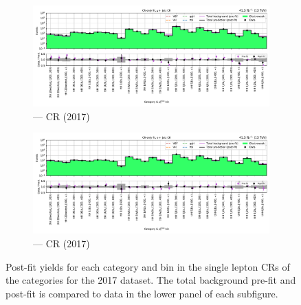 \begin{figure}[htbp]
    \centering
    \begin{subfigure}[b]{\textwidth}
        \includegraphics[width=\textwidth]{chapters/higgstoinv/figures/mountain_ranges/2017/ttH/Wmunu_tree_fit_b-abs_values_ttH_cats.pdf}
        \caption{\ttH --- \singleMuCr \gls{CR} (2017)}
    \end{subfigure}

    \begin{subfigure}[b]{\textwidth}
        \includegraphics[width=\textwidth]{chapters/higgstoinv/figures/mountain_ranges/2017/ttH/Wenu_tree_fit_b-abs_values_ttH_cats.pdf}
        \caption{\ttH --- \singleEleCr \gls{CR} (2017)}
    \end{subfigure}
    \caption[Post-fit yields for each category and \ptmiss bin in the single lepton control regions of the \ttH categories for the 2017 dataset]{Post-fit yields for each category and \ptmiss bin in the single lepton \glspl{CR} of the \ttH categories for the 2017 dataset. The total background pre-fit and post-fit is compared to data in the lower panel of each subfigure.}
    \label{fig:htoinv_mountain_range_2017_single_lep_ttH}
\end{figure}

